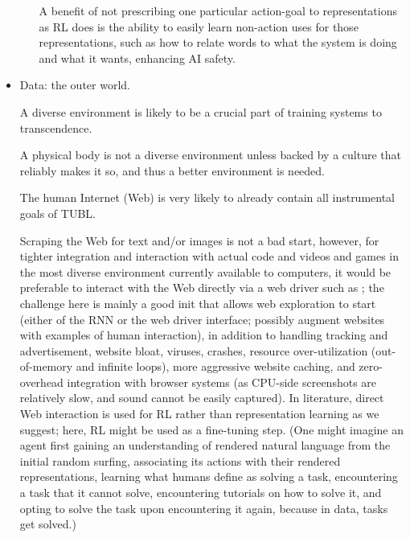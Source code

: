 \documentclass{article}
\begin{document}
\begin{itemize}
\begin{itemize}
A benefit of not prescribing one particular action-goal to representations as RL does is the ability to easily learn non-action uses for those representations, such as how to relate words to what the system is doing and what it wants, enhancing AI safety.
\end{itemize}
\item Data: the outer world.

A diverse environment is likely to be a crucial part of training systems to transcendence.

A physical body is not a diverse environment unless backed by a culture that reliably makes it so, and thus a better environment is needed.

The human Internet (Web) is very likely to already contain all instrumental goals of TUBL.

Scraping the Web for text \cite{NEURIPS2020_1457c0d6} and/or images \cite{radford2021learning} is not a bad start, however, for tighter integration and interaction with actual code and videos and games in the most diverse environment currently available to computers, it would be preferable to interact with the Web directly via a web driver such as \cite{8117878}; the challenge here is mainly a good init that allows web exploration to start (either of the RNN or the web driver interface; possibly augment websites with examples of human interaction), in addition to handling tracking and advertisement, website bloat, viruses, crashes, resource over-utilization (out-of-memory and infinite loops), more aggressive website caching, and zero-overhead integration with browser systems (as CPU-side screenshots are relatively slow, and sound cannot be easily captured). In literature, direct Web interaction is used for RL \cite{pmlr-v70-shi17a} \cite{ToyamaEtAl2021AndroidEnv} rather than representation learning as we suggest; here, RL might be used as a fine-tuning step. (One might imagine an agent first gaining an understanding of rendered natural language from the initial random surfing, associating its actions with their rendered representations, learning what humans define as solving a task, encountering a task that it cannot solve, encountering tutorials on how to solve it, and opting to solve the task upon encountering it again, because in data, tasks get solved.)


\end{itemize}
\end{document}
